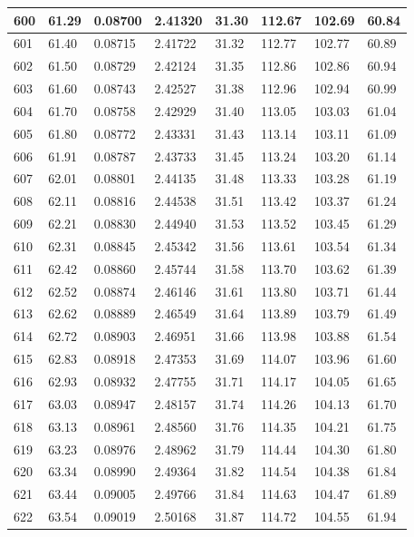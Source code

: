 \documentclass[12pt,a4paper,twoside]{article}
\begin{document}
\begin{center}
\begin{longtable}{l l l l | l l l l}
600 & 61.29 & 0.08700 & 2.41320 & 31.30 & 112.67 & 102.69 & 60.84 \\ \hline
601 & 61.40 & 0.08715 & 2.41722 & 31.32 & 112.77 & 102.77 & 60.89 \\ \hline
602 & 61.50 & 0.08729 & 2.42124 & 31.35 & 112.86 & 102.86 & 60.94 \\ \hline
603 & 61.60 & 0.08743 & 2.42527 & 31.38 & 112.96 & 102.94 & 60.99 \\ \hline
604 & 61.70 & 0.08758 & 2.42929 & 31.40 & 113.05 & 103.03 & 61.04 \\ \hline
605 & 61.80 & 0.08772 & 2.43331 & 31.43 & 113.14 & 103.11 & 61.09 \\ \hline
606 & 61.91 & 0.08787 & 2.43733 & 31.45 & 113.24 & 103.20 & 61.14 \\ \hline
607 & 62.01 & 0.08801 & 2.44135 & 31.48 & 113.33 & 103.28 & 61.19 \\ \hline
608 & 62.11 & 0.08816 & 2.44538 & 31.51 & 113.42 & 103.37 & 61.24 \\ \hline
609 & 62.21 & 0.08830 & 2.44940 & 31.53 & 113.52 & 103.45 & 61.29 \\ \hline
610 & 62.31 & 0.08845 & 2.45342 & 31.56 & 113.61 & 103.54 & 61.34 \\ \hline
611 & 62.42 & 0.08860 & 2.45744 & 31.58 & 113.70 & 103.62 & 61.39 \\ \hline
612 & 62.52 & 0.08874 & 2.46146 & 31.61 & 113.80 & 103.71 & 61.44 \\ \hline
613 & 62.62 & 0.08889 & 2.46549 & 31.64 & 113.89 & 103.79 & 61.49 \\ \hline
614 & 62.72 & 0.08903 & 2.46951 & 31.66 & 113.98 & 103.88 & 61.54 \\ \hline
615 & 62.83 & 0.08918 & 2.47353 & 31.69 & 114.07 & 103.96 & 61.60 \\ \hline
616 & 62.93 & 0.08932 & 2.47755 & 31.71 & 114.17 & 104.05 & 61.65 \\ \hline
617 & 63.03 & 0.08947 & 2.48157 & 31.74 & 114.26 & 104.13 & 61.70 \\ \hline
618 & 63.13 & 0.08961 & 2.48560 & 31.76 & 114.35 & 104.21 & 61.75 \\ \hline
619 & 63.23 & 0.08976 & 2.48962 & 31.79 & 114.44 & 104.30 & 61.80 \\ \hline
620 & 63.34 & 0.08990 & 2.49364 & 31.82 & 114.54 & 104.38 & 61.84 \\ \hline
621 & 63.44 & 0.09005 & 2.49766 & 31.84 & 114.63 & 104.47 & 61.89 \\ \hline
622 & 63.54 & 0.09019 & 2.50168 & 31.87 & 114.72 & 104.55 & 61.94 \\ \hline

\end{longtable}
\end{center}
\end{document}
